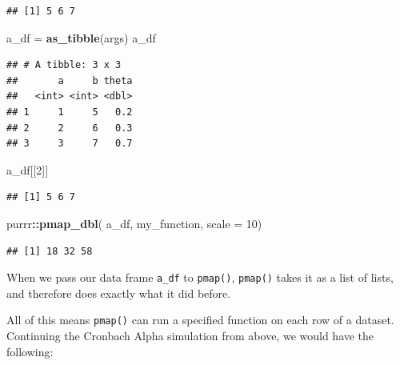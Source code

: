 \documentclass[
]{book}
\newenvironment{Shaded}{\begin{snugshade}}{\end{snugshade}}
\newcommand{\AttributeTok}[1]{\textcolor[rgb]{0.13,0.29,0.53}{#1}}
\newcommand{\DecValTok}[1]{\textcolor[rgb]{0.00,0.00,0.81}{#1}}
\newcommand{\FunctionTok}[1]{\textcolor[rgb]{0.13,0.29,0.53}{\textbf{#1}}}
\newcommand{\NormalTok}[1]{#1}
\newcommand{\OtherTok}[1]{\textcolor[rgb]{0.56,0.35,0.01}{#1}}
\newcommand{\SpecialCharTok}[1]{\textcolor[rgb]{0.81,0.36,0.00}{\textbf{#1}}}
\begin{document}
\begin{verbatim}
## [1] 5 6 7
\end{verbatim}

\begin{Shaded}
\begin{Highlighting}[]
\NormalTok{a\_df }\OtherTok{=} \FunctionTok{as\_tibble}\NormalTok{(args)}
\NormalTok{a\_df}
\end{Highlighting}
\end{Shaded}

\begin{verbatim}
## # A tibble: 3 x 3
##       a     b theta
##   <int> <int> <dbl>
## 1     1     5   0.2
## 2     2     6   0.3
## 3     3     7   0.7
\end{verbatim}

\begin{Shaded}
\begin{Highlighting}[]
\NormalTok{a\_df[[}\DecValTok{2}\NormalTok{]]}
\end{Highlighting}
\end{Shaded}

\begin{verbatim}
## [1] 5 6 7
\end{verbatim}

\begin{Shaded}
\begin{Highlighting}[]
\NormalTok{purrr}\SpecialCharTok{::}\FunctionTok{pmap\_dbl}\NormalTok{( a\_df, my\_function, }\AttributeTok{scale =} \DecValTok{10}\NormalTok{)}
\end{Highlighting}
\end{Shaded}

\begin{verbatim}
## [1] 18 32 58
\end{verbatim}

When we pass our data frame \texttt{a\_df} to \texttt{pmap()}, \texttt{pmap()} takes it as a list of lists, and therefore does exactly what it did before.

All of this means \texttt{pmap()} can run a specified function on each row of a dataset.
Continuing the Cronbach Alpha simulation from above, we would have the following:

\begin{Shaded}
\end{Shaded}
\end{document}
